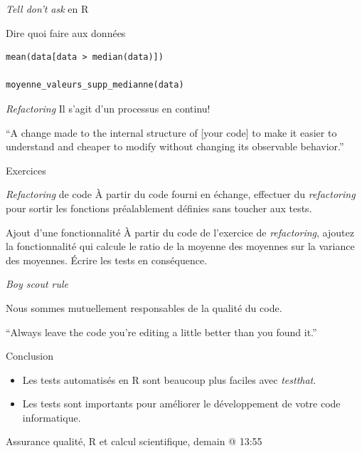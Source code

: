 \documentclass[11pt]{beamer}
\begin{document}
\begin{frame}[fragile]{\textit{Tell don't ask} en R}
\begin{block}{Dire quoi faire aux données}
\begin{lstlisting}
mean(data[data > median(data)])

moyenne_valeurs_supp_medianne(data)
\end{lstlisting}
\end{block}
\end{frame}

\begin{frame}{\textit{Refactoring}}
Il s'agit d'un processus en continu!
\begin{block}{}
{\large ``A change made to the internal structure of [your code] to make it easier to understand and cheaper to modify without changing its observable behavior.''}
\vskip5mm
\hspace*{}
\end{block}
\end{frame}

\begin{frame}{Exercices}
\begin{block}{\textit{Refactoring} de code}
À partir du code fourni en échange, effectuer du \textit{refactoring} pour sortir les fonctions préalablement définies sans toucher aux tests.
\end{block}

\begin{block}{Ajout d'une fonctionnalité}
À partir du code de l'exercice de \textit{refactoring}, ajoutez la fonctionnalité qui calcule le ratio de la moyenne des moyennes sur la variance des moyennes. Écrire les tests en conséquence.
\end{block}
\end{frame}

\begin{frame}{\textit{Boy scout rule}}

Nous sommes mutuellement responsables de la qualité du code.

\begin{block}{}
{\large ``Always leave the code you're editing a little better than you found it.''}
\vskip5mm
\hspace*{}
\end{block}
\end{frame}


\begin{frame}{Conclusion}
\begin{itemize}
	\item Les tests automatisés en R sont beaucoup plus faciles avec \textit{testthat}.
	\item Les tests sont importants pour améliorer le développement de votre code informatique.
\end{itemize}

\begin{block}{}
\centering Assurance qualité, R et calcul scientifique, demain @ 13:55 
\end{block}
\end{frame}
\end{document}
